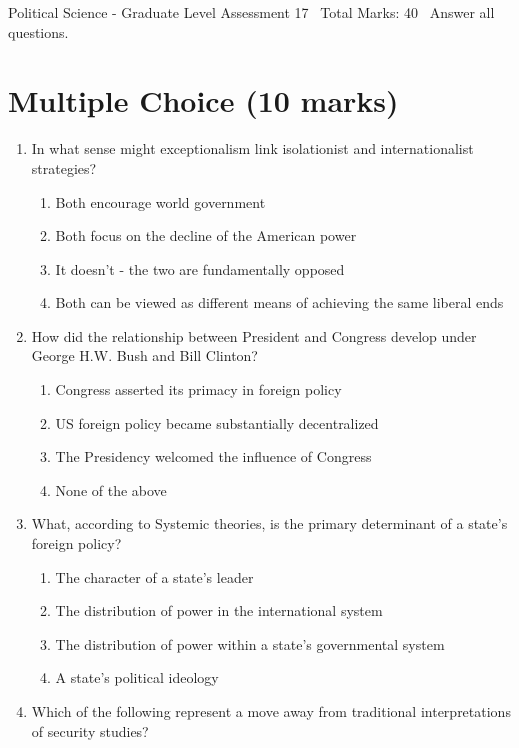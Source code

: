 \documentclass[12pt]{article}
\begin{document}
\begin{center}
Political Science - Graduate Level Assessment 17 \
Total Marks: 40 \
Answer all questions.
\end{center}

\section*{Multiple Choice (10 marks)}
\begin{enumerate}[label=\arabic*.]
\item In what sense might exceptionalism link isolationist and internationalist strategies?
\begin{enumerate}[label=(\alph*)]
    \item Both encourage world government
    \item Both focus on the decline of the American power
    \item It doesn't - the two are fundamentally opposed
    \item Both can be viewed as different means of achieving the same liberal ends
\end{enumerate}
\item How did the relationship between President and Congress develop under George H.W. Bush and Bill Clinton?
\begin{enumerate}[label=(\alph*)]
    \item Congress asserted its primacy in foreign policy
    \item US foreign policy became substantially decentralized
    \item The Presidency welcomed the influence of Congress
    \item None of the above
\end{enumerate}
\item What, according to Systemic theories, is the primary determinant of a state's foreign policy?
\begin{enumerate}[label=(\alph*)]
    \item The character of a state's leader
    \item The distribution of power in the international system
    \item The distribution of power within a state's governmental system
    \item A state's political ideology
\end{enumerate}
\item Which of the following represent a move away from traditional interpretations of security studies?

\end{enumerate}
\end{document}
